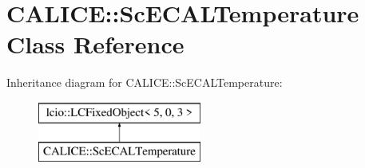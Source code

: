 \section{C\-A\-L\-I\-C\-E\-:\-:Sc\-E\-C\-A\-L\-Temperature Class Reference}
\label{classCALICE_1_1ScECALTemperature}
Inheritance diagram for C\-A\-L\-I\-C\-E\-:\-:Sc\-E\-C\-A\-L\-Temperature\-:\begin{figure}[H]
\begin{center}
\leavevmode
\includegraphics[height=2.000000cm]{classCALICE_1_1ScECALTemperature}
\end{center}
\end{figure}
